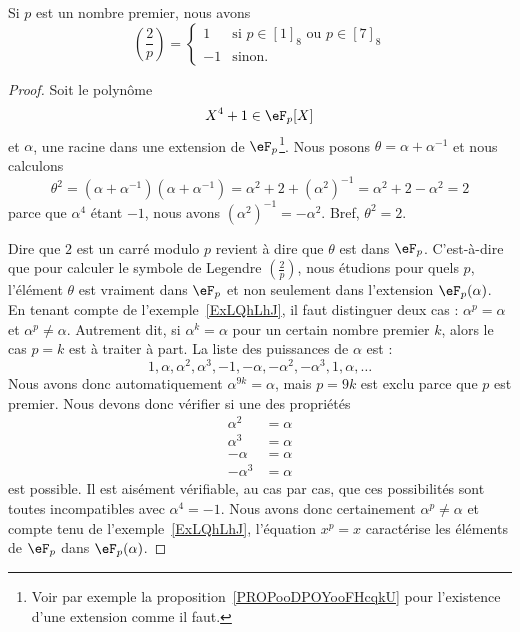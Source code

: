 \begin{proposition}		\label{PROPooCLEUooHWnoXM}
	Si \( p\) est un nombre premier, nous avons
	\begin{equation}
		\left(\frac{2}{p}\right)=\begin{cases}
			1  & \text{si } p\in [1]_8\text{ ou } p\in [7]_8 \\
			-1 & \text{sinon}.
		\end{cases}
	\end{equation}
\end{proposition}

\begin{proof}
	Soit le polynôme
	\begin{equation}
		X^4+1\in \eF_p[X]
	\end{equation}
	et \( \alpha\), une racine dans une extension de \( \eF_p\)\footnote{Voir par exemple la proposition~\ref{PROPooDPOYooFHcqkU} pour l'existence d'une extension comme il faut.}. Nous posons \( \theta=\alpha+\alpha^{-1}\) et nous calculons
	\begin{equation}
		\theta^2=(\alpha+\alpha^{-1})(\alpha+\alpha^{-1})=\alpha^2+2+(\alpha^2)^{-1}=\alpha^2+2-\alpha^2=2
	\end{equation}
	parce que \( \alpha^4\) étant \( -1\), nous avons \( (\alpha^2)^{-1}=-\alpha^2\). Bref, \( \theta^2=2\).

	Dire que \( 2\) est un carré modulo \( p\) revient à dire que \( \theta\) est dans \( \eF_p\). C'est-à-dire que pour calculer le symbole de Legendre \( \left(\frac{2}{p}\right)\), nous étudions pour quels \( p\), l'élément \( \theta\) est vraiment dans \( \eF_p\) et non seulement dans l'extension \( \eF_p(\alpha)\). En tenant compte de l'exemple~\ref{ExLQhLhJ}, il faut distinguer deux cas : \( \alpha^p=\alpha\) et \( \alpha^p\neq \alpha\). Autrement dit, si \( \alpha^k=\alpha\) pour un certain nombre premier \( k\), alors le cas \( p=k\) est à traiter à part. La liste des puissances de \( \alpha\) est :
	\begin{equation}
		1,\alpha,\alpha^2,\alpha^3,-1,-\alpha,-\alpha^2,-\alpha^3,1,\alpha,\ldots
	\end{equation}
	Nous avons donc automatiquement \( \alpha^{9k}=\alpha\), mais \( p=9k\) est exclu parce que \( p\) est premier. Nous devons donc vérifier si une des propriétés
	\begin{subequations}
		\begin{align}
			\alpha^2  & =\alpha \\
			\alpha^3  & =\alpha \\
			-\alpha   & =\alpha \\
			-\alpha^3 & =\alpha
		\end{align}
	\end{subequations}
	est possible. Il est aisément vérifiable, au cas par cas, que ces possibilités sont toutes incompatibles avec \( \alpha^4=-1\). Nous avons donc certainement \( \alpha^p\neq \alpha\) et compte tenu de l'exemple~\ref{ExLQhLhJ}, l'équation \( x^p=x\) caractérise les éléments de \( \eF_p\) dans \( \eF_p(\alpha)\).


\end{proof}
